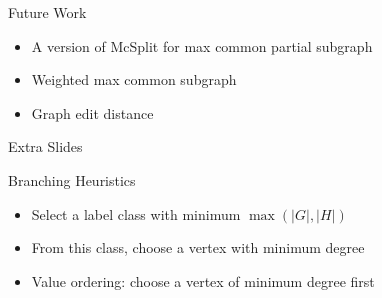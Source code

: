 \documentclass{beamer}
\begin{document}
\begin{frame}{Future Work}
    \begin{itemize}
        \item A version of McSplit for max common partial subgraph
        \item Weighted max common subgraph
        \item Graph edit distance
    \end{itemize}
\end{frame}

\begin{frame}{Extra Slides}
\end{frame}

\begin{frame}{Branching Heuristics}

    \begin{itemize}
        \item Select a label class with minimum $\max(|G|,|H|)$
        \item From this class, choose a vertex with minimum degree
        \item Value ordering: choose a vertex of minimum degree first
    \end{itemize}

\end{frame}
\end{document}
